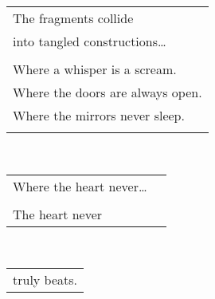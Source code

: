 \documentclass{article}
\begin{document}
\begin{center}
\begin{tabular}{l}
\\
The fragments collide \\
into tangled constructions\ldots{} \\
\\
Where a whisper is a scream. \\
Where the doors are always open. \\
Where the mirrors never sleep. \\
\\
\end{tabular} \\
\begin{tabular}{ll}
Where the heart never\ldots{} &\\
&\\
The heart never &\\
\end{tabular}\\
\begin{tabular}{l}
truly beats. \\
\end{tabular}
\end{center}
\end{document}
